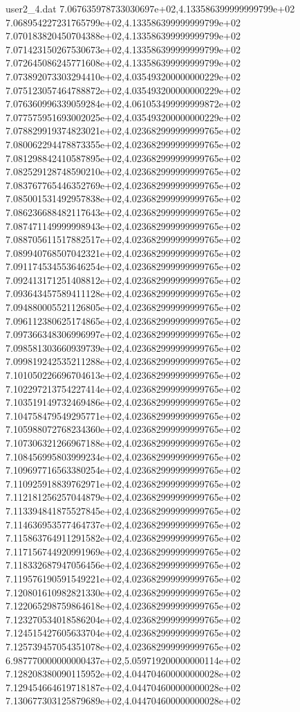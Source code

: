 \begin{filecontents}{user2_4.dat}
7.067635978733030697e+02,4.133586399999999799e+02
7.068954227231765799e+02,4.133586399999999799e+02
7.070183820450704388e+02,4.133586399999999799e+02
7.071423150267530673e+02,4.133586399999999799e+02
7.072645086245771608e+02,4.133586399999999799e+02
7.073892073303294410e+02,4.035493200000000229e+02
7.075123057464788872e+02,4.035493200000000229e+02
7.076360996339059284e+02,4.061053499999999872e+02
7.077575951693002025e+02,4.035493200000000229e+02
7.078829919374823021e+02,4.023682999999999765e+02
7.080062294478873355e+02,4.023682999999999765e+02
7.081298842410587895e+02,4.023682999999999765e+02
7.082529128748590210e+02,4.023682999999999765e+02
7.083767765446352769e+02,4.023682999999999765e+02
7.085001531492957838e+02,4.023682999999999765e+02
7.086236688482117643e+02,4.023682999999999765e+02
7.087471149999998943e+02,4.023682999999999765e+02
7.088705611517882517e+02,4.023682999999999765e+02
7.089940768507042321e+02,4.023682999999999765e+02
7.091174534553646254e+02,4.023682999999999765e+02
7.092413171251408812e+02,4.023682999999999765e+02
7.093643457589411128e+02,4.023682999999999765e+02
7.094880005521126805e+02,4.023682999999999765e+02
7.096112380625174865e+02,4.023682999999999765e+02
7.097366348306996997e+02,4.023682999999999765e+02
7.098581303660939739e+02,4.023682999999999765e+02
7.099819242535211288e+02,4.023682999999999765e+02
7.101050226696704613e+02,4.023682999999999765e+02
7.102297213754227414e+02,4.023682999999999765e+02
7.103519149732469486e+02,4.023682999999999765e+02
7.104758479549295771e+02,4.023682999999999765e+02
7.105988072768234360e+02,4.023682999999999765e+02
7.107306321266967188e+02,4.023682999999999765e+02
7.108456995803999234e+02,4.023682999999999765e+02
7.109697716563380254e+02,4.023682999999999765e+02
7.110925918839762971e+02,4.023682999999999765e+02
7.112181256257044879e+02,4.023682999999999765e+02
7.113394841875527845e+02,4.023682999999999765e+02
7.114636953577464737e+02,4.023682999999999765e+02
7.115863764911291582e+02,4.023682999999999765e+02
7.117156744920991969e+02,4.023682999999999765e+02
7.118332687947056456e+02,4.023682999999999765e+02
7.119576190591549221e+02,4.023682999999999765e+02
7.120801610982821330e+02,4.023682999999999765e+02
7.122065298759864618e+02,4.023682999999999765e+02
7.123270534018586204e+02,4.023682999999999765e+02
7.124515427605633704e+02,4.023682999999999765e+02
7.125739457054351078e+02,4.023682999999999765e+02
6.987770000000000437e+02,5.059719200000000114e+02
7.128208380090115952e+02,4.044704600000000028e+02
7.129454664619718187e+02,4.044704600000000028e+02
7.130677303125879689e+02,4.044704600000000028e+02

\end{filecontents}
